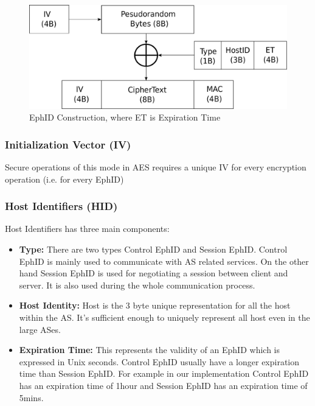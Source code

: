 \begin{figure}[th]
\centering
\includegraphics[scale=0.5]{Figures/ephid_construction.pdf}
\decoRule
\caption[EphID Construction]{EphID Construction, where ET is Expiration Time}
\label{fig:ephid_con}
\end{figure}

\subsubsection{Initialization Vector (IV)}
Secure operations of this mode in AES requires a unique IV for every encryption operation (i.e. for every EphID)

\subsubsection{Host Identifiers (HID)}
\begin{center}
\end{center}
Host Identifiers has three main components:
\begin{itemize}
    \item \textbf{Type:} There are two types Control EphID and Session EphID. Control EphID is mainly used to communicate with AS related services. On the other hand Session EphID is used for negotiating a session between client and server. It is also used during the whole communication process.
    \item \textbf{Host Identity:} Host is the 3 byte unique representation for all the host within the AS. It's sufficient enough to uniquely represent all host even in the large ASes.
    \item \textbf{Expiration Time:} This represents the validity of an EphID which is expressed in Unix seconds. Control EphID usually have a longer expiration time than Session EphID. For example in our implementation Control EphID has an expiration time of 1hour and Session EphID has an expiration time of 5mins.
\end{itemize}

